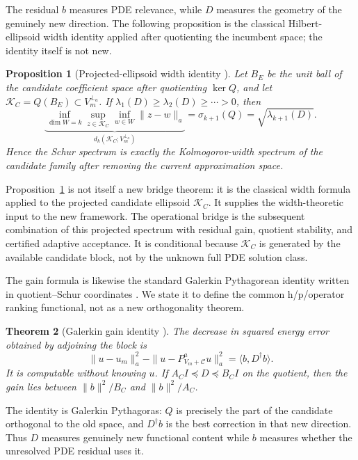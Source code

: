 \documentclass[11pt]{article}
\newtheorem{theorem}{Theorem}[section]
\newtheorem{proposition}[theorem]{Proposition}
\numberwithin{algorithm}{section}
\theoremstyle{definition}\newtheorem{definition}[theorem]{Definition}
\theoremstyle{remark}\newtheorem{remark}[theorem]{Remark}
\begin{document}
The residual $b$ measures PDE relevance, while $D$ measures the geometry of
the genuinely new direction.  The following proposition is the classical
Hilbert-ellipsoid width identity \cite{kolmogorov1936,pinkus1985} applied after
quotienting the incumbent space; the identity itself is not new.

\begin{proposition}[Projected-ellipsoid width identity
  {\cite{kolmogorov1936,pinkus1985}}]
\label{prop:conditional-width}
Let $B_E$ be the unit ball of the candidate coefficient space after
quotienting $\ker Q$, and let
$\mathcal K_C=Q(B_E)\subset V_m^{\perp_a}$.  If
$\lambda_1(D)\geq\lambda_2(D)\geq\cdots>0$, then
\begin{equation}
 \underbrace{\inf_{\dim W=k}\sup_{z\in\mathcal K_C}
              \inf_{w\in W}\|z-w\|_a}_{d_k(\mathcal K_C;V_m^{\perp_a})}
 =\sigma_{k+1}(Q)=\sqrt{\lambda_{k+1}(D)}.
 \label{eq:conditional-width}
\end{equation}
Hence the Schur spectrum is exactly the Kolmogorov-width spectrum of the
candidate family after removing the current approximation space.
\end{proposition}

Proposition~\ref{prop:conditional-width} is not itself a new bridge theorem:
it is the classical width formula applied to the projected candidate
ellipsoid $\mathcal K_C$.  It supplies the width-theoretic input to the new
framework.  The operational bridge is the subsequent combination of this
projected spectrum with residual gain, quotient stability, and certified
adaptive acceptance.  It is conditional because $\mathcal K_C$ is generated
by the available candidate block, not by the unknown full PDE solution class.

The gain formula is likewise the standard Galerkin Pythagorean identity
written in quotient--Schur coordinates \cite{ciarlet1978}.  We state it to
define the common h/p/operator ranking functional, not as a new orthogonality
theorem.

\begin{theorem}[Galerkin gain identity
  {\cite{ciarlet1978}}]
\label{thm:main-exact-gain}
The decrease in squared energy error obtained by adjoining the block is
\begin{equation}
 \|u-u_m\|_a^2-\|u-P_{V_m+\mathcal C}^au\|_a^2
 =\langle b,D^\dagger b\rangle.
 \label{eq:main-exact-gain}
\end{equation}
It is computable without knowing $u$.  If
$A_CI\preceq D\preceq B_CI$ on the quotient, then the gain lies between
$\|b\|^2/B_C$ and $\|b\|^2/A_C$.
\end{theorem}
The identity is Galerkin Pythagoras: $Q$ is precisely the part of the candidate
orthogonal to the old space, and $D^\dagger b$ is the best correction in that
new direction.  Thus $D$ measures genuinely new functional content while
$b$ measures whether the unresolved PDE residual uses it.
\end{document}
